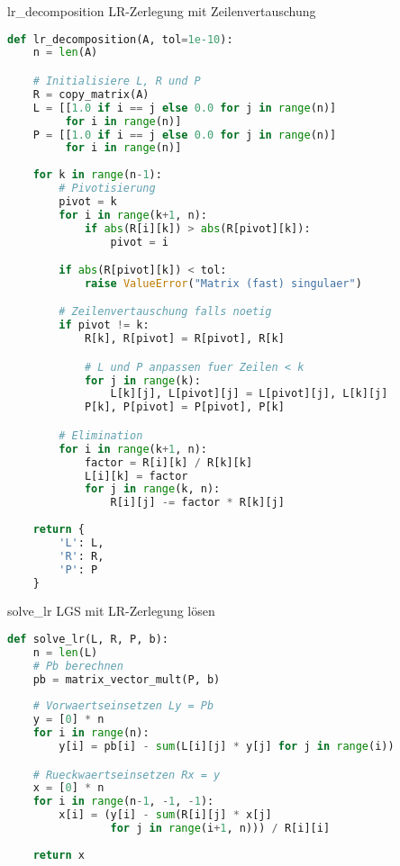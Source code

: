 \begin{examplecode}{lr\_decomposition} LR-Zerlegung mit Zeilenvertauschung
\begin{lstlisting}[language=Python, style=basesmol]
def lr_decomposition(A, tol=1e-10):
    n = len(A)

    # Initialisiere L, R und P
    R = copy_matrix(A)
    L = [[1.0 if i == j else 0.0 for j in range(n)] 
         for i in range(n)]
    P = [[1.0 if i == j else 0.0 for j in range(n)] 
         for i in range(n)]
    
    for k in range(n-1):
        # Pivotisierung
        pivot = k
        for i in range(k+1, n):
            if abs(R[i][k]) > abs(R[pivot][k]):
                pivot = i

        if abs(R[pivot][k]) < tol:
            raise ValueError("Matrix (fast) singulaer")

        # Zeilenvertauschung falls noetig
        if pivot != k:
            R[k], R[pivot] = R[pivot], R[k]

            # L und P anpassen fuer Zeilen < k
            for j in range(k):
                L[k][j], L[pivot][j] = L[pivot][j], L[k][j]
            P[k], P[pivot] = P[pivot], P[k]

        # Elimination
        for i in range(k+1, n):
            factor = R[i][k] / R[k][k]
            L[i][k] = factor
            for j in range(k, n):
                R[i][j] -= factor * R[k][j]
    
    return {
        'L': L,
        'R': R,
        'P': P
    }
\end{lstlisting}
\end{examplecode}

\begin{examplecode}{solve\_lr} LGS mit LR-Zerlegung lösen
\begin{lstlisting}[language=Python, style=basesmol]
def solve_lr(L, R, P, b):
    n = len(L)
    # Pb berechnen
    pb = matrix_vector_mult(P, b)
    
    # Vorwaertseinsetzen Ly = Pb
    y = [0] * n
    for i in range(n):
        y[i] = pb[i] - sum(L[i][j] * y[j] for j in range(i))

    # Rueckwaertseinsetzen Rx = y
    x = [0] * n
    for i in range(n-1, -1, -1):
        x[i] = (y[i] - sum(R[i][j] * x[j] 
                for j in range(i+1, n))) / R[i][i]
                
    return x
\end{lstlisting}
\end{examplecode}

